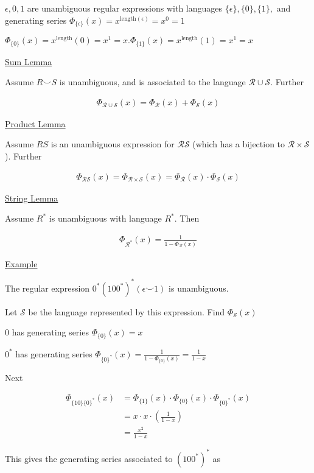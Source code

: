 \documentclass{article}
\newcommand\mc{\mathcal}
\begin{document}
$\epsilon, 0, 1$ are unambiguous regular expressions with languages $\{\epsilon\}, \{0\},\{1\},$ and generating series $\Phi_{\{\epsilon\}}(x) = x^{\text{length}(\epsilon)} = x^0 = 1$

$\Phi_{\{0\}}(x) = x^\text{length}(0) = x^1 = x. \Phi_{\{1\}}(x) = x^\text{length}(1) = x^1 = x$

\underline{Sum Lemma}

Assume $R \smile S$ is unambiguous, and is associated to the language $\mc{R} \cup \mc{S}$. Further

\begin{align*}
    \Phi_{\mc{R} \cup \mc{S}}(x) = \Phi_{\mc{R}}(x) + \Phi_{\mc{S}}(x)
\end{align*}

\underline{Product Lemma}

Assume $RS$ is an unambiguous expression for $\mc{RS}$ (which has a bijection to $\mc{R} \times \mc{S}$). Further

\begin{align*}
    \Phi_{\mc{RS}}(x) = \Phi_{\mc{R} \times \mc{S}}(x) = \Phi_{\mc{R}}(x) \cdot \Phi_{\mc{S}}(x)
\end{align*}


\underline{String Lemma}

Assume $R^*$ is unambiguous with language $R^*$. Then

\begin{align*}
    \Phi_{\mc{R}^*}(x) = \frac{1}{1-\Phi_{\mc{R}}(x)}
\end{align*}

\underline{Example}

The regular expression $0^*(100^*)^*(\epsilon \smile 1)$ is unambiguous.

Let $\mc{S}$ be the language represented by this expression. Find $\Phi_{\mc{S}}(x)$

$0$ has generating series $\Phi_{\{0\}}(x) = x$

$0^*$ has generating series $\Phi_{\{0\}^*}(x) = \frac{1}{1-\Phi_{\{0\}}(x)} = \frac{1}{1-x}$

Next 

\begin{align*}
    \Phi_{\{10\}\{0\}^*}(x) &= \Phi_{\{1\}}(x) \cdot \Phi_{\{0\}}(x) \cdot \Phi_{\{0\}^*}(x) \\
    &= x \cdot x \cdot (\frac{1}{1-x}) \\
    &= \frac{x^2}{1-x}
\end{align*}

This gives the generating series associated to $(100^*)^*$ as
\end{document}
